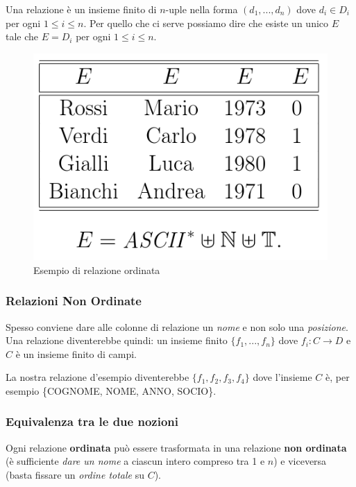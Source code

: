 \documentclass{article}
\begin{document}
\bigskip

Una relazione è un insieme finito di $n$-uple nella forma $(d_1,...,d_n)$ dove $d_i\in D_i$ per ogni $1\leq i\leq n$. Per quello che ci serve possiamo dire che esiste un unico $E$ tale che $E =D_i$ per ogni $1\leq i\leq n$.

\begin{figure}[!ht]
    \centering
    \includegraphics[width=\textwidth]{table.png}
    \caption{Esempio di relazione ordinata}
    \label{fig:tab}
\end{figure}

\subsubsection{Relazioni Non Ordinate}
Spesso conviene dare alle colonne di relazione un \textit{nome} e non solo una \textit{posizione}. Una relazione diventerebbe quindi: un insieme finito $\{f_1,...,f_n\}$ dove $f_i:C\to D$ e $C$ è un insieme finito di campi.

\bigskip

La nostra relazione d'esempio diventerebbe $\{f_1,f_2,f_3,f_4\}$ dove l'insieme $C$ è, per esempio \{COGNOME, NOME, ANNO, SOCIO\}.

\subsubsection{Equivalenza tra le due nozioni}
Ogni relazione \textbf{ordinata} può essere trasformata in una relazione \textbf{non ordinata} (è sufficiente \textit{dare un nome} a ciascun intero compreso tra 1 e $n$) e viceversa (basta fissare un \textit{ordine totale} su $C$).
\end{document}
